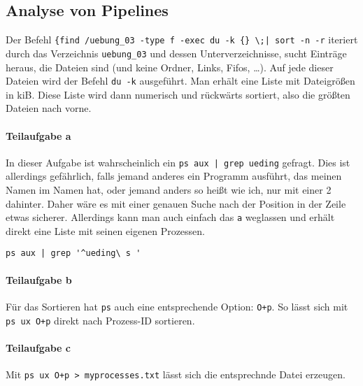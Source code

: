 \documentclass[12pt]{article}
\begin{document}
\lstset{language=bash}





\subsection{Analyse von Pipelines}

Der Befehl \verb#{find /uebung_03 -type f -exec du -k {} \;| sort -n -r# iteriert durch das Verzeichnis \verb#uebung_03# und dessen Unterverzeichnisse, sucht Einträge heraus, die Dateien sind (und keine Ordner, Links, Fifos, …). Auf jede dieser Dateien wird der Befehl \texttt{du -k} ausgeführt. Man erhält eine Liste mit Dateigrößen in kiB. Diese Liste wird dann numerisch und rückwärts sortiert, also die größten Dateien nach vorne.

\paragraph{Teilaufgabe a}
In dieser Aufgabe ist wahrscheinlich ein \verb#ps aux | grep ueding# gefragt. Dies ist allerdings gefährlich, falls jemand anderes ein Programm ausführt, das meinen Namen im Namen hat, oder jemand anders so heißt wie ich, nur mit einer 2 dahinter. Daher wäre es mit einer genauen Suche nach der Position in der Zeile etwas sicherer. Allerdings kann man auch einfach das \texttt{a} weglassen und erhält direkt eine Liste mit seinen eigenen Prozessen.

\begin{lstlisting}[caption=Einschänkung des Suchbereichs]
ps aux | grep '^ueding\ s '
\end{lstlisting}

\paragraph{Teilaufgabe b}
Für das Sortieren hat \texttt{ps} auch eine entsprechende Option: \texttt{O+p}. So lässt sich mit \texttt{ps ux O+p} direkt nach Prozess-ID sortieren.

\paragraph{Teilaufgabe c}
Mit \verb#ps ux O+p > myprocesses.txt# lässt sich die entsprechnde Datei erzeugen.  
\end{document}
